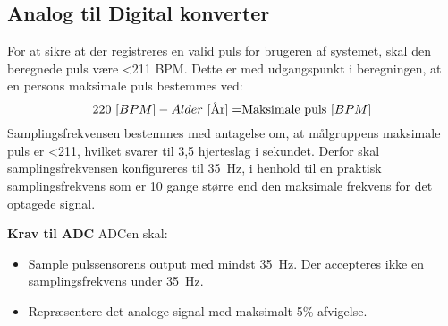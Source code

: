 \subsection{Analog til Digital konverter} \label{krav_adc}
For at sikre at der registreres en valid puls for brugeren af systemet, skal den beregnede puls være <211 BPM. Dette er med udgangspunkt i beregningen, at en persons maksimale puls bestemmes ved: \citep{CooperBlair2005} 
\begin{equation}
220~[BPM] - Alder~[$År$] = $Maksimale puls$~[BPM]
\end{equation}
Samplingsfrekvensen bestemmes med antagelse om, at målgruppens maksimale puls er <211, hvilket svarer til 3,5 hjerteslag i sekundet. Derfor skal samplingsfrekvensen konfigureres til 35~Hz, i henhold til en praktisk samplingsfrekvens som er 10 gange større end den maksimale frekvens for det optagede signal. \citep{Webster2011}

\textbf{Krav til ADC} \newline
ADCen skal:
\begin{itemize}
	\item Sample pulssensorens output med mindst 35~Hz. Der accepteres ikke en samplingsfrekvens under 35~Hz. 
	\item Repræsentere det analoge signal med maksimalt 5\% afvigelse. 
\end{itemize}


